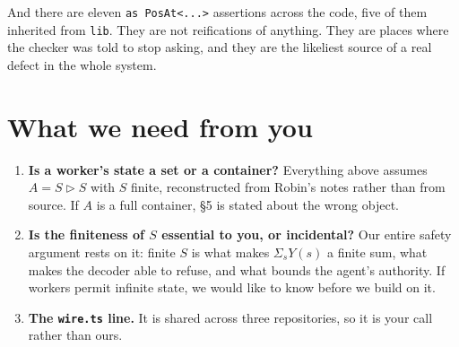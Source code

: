 \documentclass[11pt,a4paper]{article}
\begin{document}
And there are eleven \texttt{as PosAt<...>} assertions across the code, five of
them inherited from \texttt{lib}. They are not reifications of anything. They are
places where the checker was told to stop asking, and they are the likeliest
source of a real defect in the whole system.

\section{What we need from you}

\begin{enumerate}
\item \textbf{Is a worker's state a set or a container?} Everything above
  assumes $A = S \triangleright S$ with $S$ finite, reconstructed from Robin's
  notes rather than from source. If $A$ is a full container, \S5 is stated about
  the wrong object.

\item \textbf{Is the finiteness of $S$ essential to you, or incidental?} Our
  entire safety argument rests on it: finite $S$ is what makes $\Sigma_s Y(s)$ a
  finite sum, what makes the decoder able to refuse, and what bounds the agent's
  authority. If workers permit infinite state, we would like to know before we
  build on it.

\item \textbf{The \texttt{wire.ts} line.} It is shared across three
  repositories, so it is your call rather than ours.
\end{enumerate}
\end{document}
